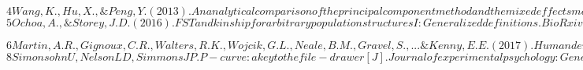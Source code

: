\documentclass[12pt]{article}
\begin{document}
$
4
Wang, K., Hu, X., \& Peng, Y. (2013). An analytical comparison of the principal component method and the mixed effects model for association studies in the presence of cryptic relatedness and population stratification. Human heredity, 76(1), 1-9.
$\\



$
5
Ochoa, A., \& Storey, J. D. (2016). FST and kinship for arbitrary population structures I: Generalized definitions. BioRxiv, 083915.
$

$
6
Martin, A. R., Gignoux, C. R., Walters, R. K., Wojcik, G. L., Neale, B. M., Gravel, S., ... \& Kenny, E. E. (2017). Human demographic history impacts genetic risk prediction across diverse populations. The American Journal of Human Genetics, 100(4), 635-649.
$\\



$
8
Simonsohn U, Nelson L D, Simmons J P. P-curve: a key to the file-drawer[J]. Journal of experimental psychology: General, 2014, 143(2): 534.
$
\end{document}
